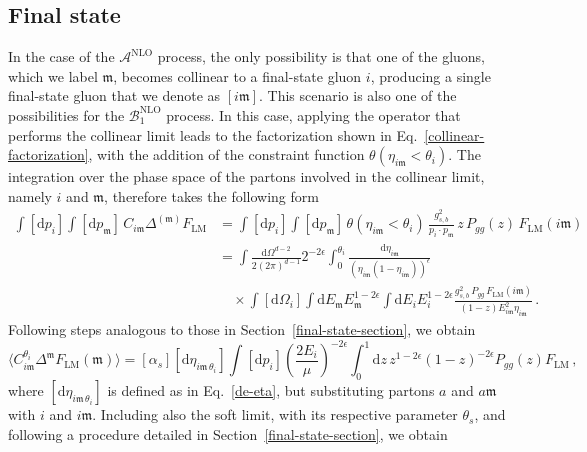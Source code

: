 \documentclass[a4paper, 12pt]{book}
\newcommand{\um}{\mathfrak{m}}
\begin{document}
\subsection{Final state}
\label{final-state-parameters-section}
In the case of the $\mathcal{A}^{\mathrm{NLO}}$ process, the only possibility is that one of the gluons, which we label $\um$, becomes collinear to a final-state gluon $i$, producing a single final-state gluon that we denote as $[i\um]$. This scenario is also one of the possibilities for the $\mathcal{B}_1^{\mathrm{NLO}}$ process. In this case, applying the operator that performs the collinear limit leads to the factorization shown in Eq.~\ref{collinear-factorization}, with the addition of the constraint function $\theta(\eta_{i\um}<\theta_i)$. The integration over the phase space of the partons involved in the collinear limit, namely $i$ and $\um$, therefore takes the following form
\begin{equation}
  \begin{aligned}
    \int [\mathrm{d}p_i] \int [\mathrm{d}p_\um] \, C_{i\um} \Delta^{(\um)} F_{\mathrm{LM}} & = \int [\mathrm{d}p_i] \int [\mathrm{d}p_\um] \, \theta{(\eta_{i\um} < \theta_i )} \, \frac{g^2_{s,b}}{p_i \cdot p_\um} \, z \, P_{gg}(z) \, F_{\mathrm{LM}}(i \um) \\
    &= \int \frac{\mathrm{d}\Omega^{d-2}}{2(2\pi)^{d-1}} 2^{-2\epsilon} \int_0^{\theta_i} \frac{\mathrm{d}\eta_{i\um}}{(\eta_{i\um}(1-\eta_{i\um}))^{\epsilon}} \nonumber \\
    &\quad \times \int [\mathrm{d}\Omega_i] \int \mathrm{d}E_\um E_\um^{1-2\epsilon} \int \mathrm{d}E_i E_i^{1-2\epsilon} \frac{g_{s,b}^2 \,  P_{gg} \, F_{\mathrm{LM}} (i\um) }{(1-z) E_{i\um}^{2}\eta_{i\um}} \, .
  \end{aligned}
\end{equation}
Following steps analogous to those in Section~\ref{final-state-section}, we obtain
\begin{equation}
  \langle C_{i\um}^{\theta_i} \Delta^\um F_{\mathrm{LM}} (\um) \rangle = [\alpha_s] [\mathrm{d}\eta_{i\um \, \theta_i}] \int [\mathrm{d}p_i] \left( \frac{2 E_i}{\mu}\right)^{-2 \epsilon} \int_0^1 \mathrm{d}z \, z^{1-2\epsilon} (1-z)^{-2\epsilon} P_{gg}(z) F_{\mathrm{LM}} \, ,
\end{equation}
where $[\mathrm{d}\eta_{i\um \, \theta_i}]$ is defined as in Eq.~\ref{de-eta}, but substituting partons $a$ and $a\um$ with $i$ and $i\um$. Including also the soft limit, with its respective parameter $\theta_s$, and following a procedure detailed in Section~\ref{final-state-section}, we obtain
\end{document}

